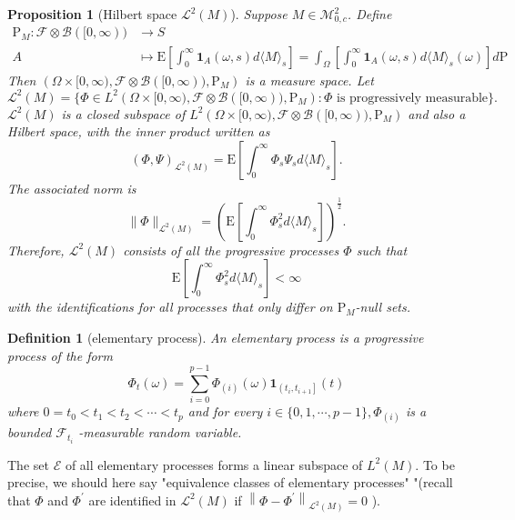 \documentclass{report}
\newtheorem{definition}{Definition}[section]
\newtheorem{proposition}{Proposition}[section]
\theoremstyle{nonumberplain}
\begin{document}
\begin{proposition}[Hilbert space $\mathscr{L}^2(M)$]
	Suppose $M\in \mathscr{M}^2_{0,c}$. Define
	\begin{align*}
	\mathrm{P}_{M}: \mathcal{F} \otimes \mathcal{B}([0, \infty))&\longrightarrow S\\
	A&\longmapsto \mathrm{E}\left[\int_{0}^{\infty} \mathbf{1}_{A}(\omega, s) d\langle M\rangle_{s}\right]=\int_{\Omega}\left[\int_{0}^{\infty} \mathbf{1}_{A}(\omega, s) d\langle M\rangle_{s}(\omega)\right]d\mathrm{P}
	\end{align*}
	Then $\left( \Omega\times[0, \infty) ,  \mathcal{F}\otimes \mathcal{B}([0, \infty)), \mathrm{P}_{M}\right)$ is a measure space. Let 
	$$
	\mathscr{L}^2(M)=\{\Phi\in L^2\left( \Omega\times[0, \infty) ,\mathcal{F}\otimes \mathcal{B}([0, \infty)), \mathrm{P}_{M}\right):\Phi \text{ is progressively measurable}\}.
	$$
	$\mathscr{L}^2(M)$ is a closed subspace of $L^2\left( \Omega\times[0, \infty) ,\mathcal{F}\otimes \mathcal{B}([0, \infty)), \mathrm{P}_{M}\right)$ and also a Hilbert space, with the inner product written as
	\[
	(\Phi,\Psi)_{\mathscr{L}^2(M)}= \mathrm{E}\left[\int_{0}^{\infty} \Phi_s\Psi_s d\langle M\rangle_{s}\right].
	\]
	The associated norm is
	\[
	\|\Phi\|_{\mathscr{L}^2(M)}=\left(\mathrm{E}\left[\int_{0}^{\infty} \Phi_{s}^{2} d\langle M\rangle_{s}\right]\right)^{\tfrac{1}{2}}.
	\]
	Therefore, $\mathscr{L}^2(M)$ consists of all the progressive processes $\Phi$ such that
	\[
	\mathrm{E}\left[\int_{0}^{\infty} \Phi_{s}^{2} d\langle M\rangle_{s}\right]<\infty
	\]
	with the identifications for all processes that only differ on $\mathrm{P}_M$-null sets.
\end{proposition}

\begin{definition}[elementary process]
An elementary process is a progressive process of the form
\[
\Phi_{t}(\omega)=\sum_{i=0}^{p-1} \Phi_{(i)}(\omega) \mathbf{1}_{\left(t_{i}, t_{i+1}\right]}(t)
\]
where $0=t_{0}<t_{1}<t_{2}<\cdots<t_{p}$ and for every $i \in\{0,1, \cdots, p-1\}, \Phi_{(i)}$ is a
bounded $\mathcal{F}_{t_{i}}$ -measurable random variable.
\end{definition}

The set $\mathscr{E}$ of all elementary processes forms a linear subspace of $L^{2}(M) .$ To be precise, we should here say "equivalence classes of elementary processes" "(recall that $\Phi$ and $\Phi^{\prime}$ are identified in $\mathscr{L}^{2}(M)$ if $\left\|\Phi-\Phi^{\prime}\right\|_{\mathscr{L}^{2}(M)}=0$ ).
\end{document}
